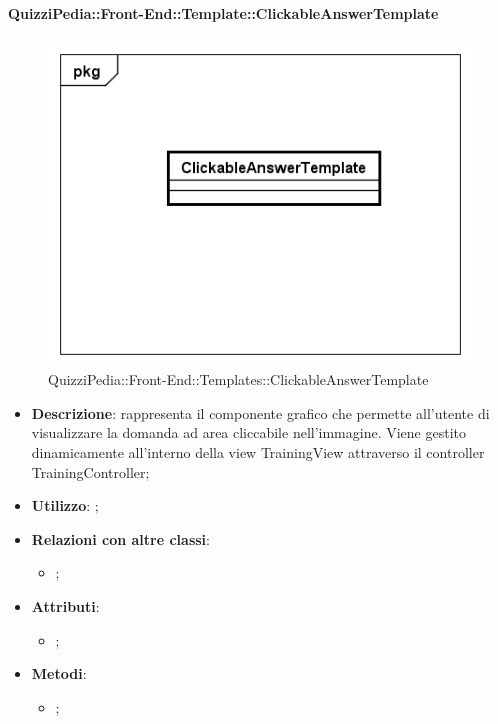 		\paragraph{QuizziPedia::Front-End::Template::ClickableAnswerTemplate}
		
		\label{QuizziPedia::Front-End::Templates::ClickableAnswerTemplate}
		
		\begin{figure}[h]
			\centering
			\includegraphics[scale=0.5,keepaspectratio]{UML/Classi/Front-End/QuizziPedia_Front-end_Templates_ClickableAnswerTemplate.png}
			\caption{QuizziPedia::Front-End::Templates::ClickableAnswerTemplate}
		\end{figure}
		
		\begin{itemize}
			\item \textbf{Descrizione}: rappresenta il componente grafico che permette all'utente di visualizzare la domanda ad area cliccabile nell'immagine. Viene gestito dinamicamente all'interno della view TrainingView attraverso il controller TrainingController;
			\item \textbf{Utilizzo}: ;
			\item \textbf{Relazioni con altre classi}: 
			\begin{itemize}
				\item ;
			\end{itemize}
			\item \textbf{Attributi}: 
			\begin{itemize}
				\item ;
			\end{itemize}
			\item \textbf{Metodi}: 
			\begin{itemize}
				\item ;
			\end{itemize}
		\end{itemize}
	
